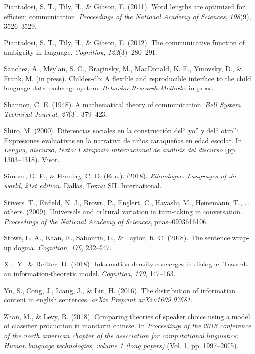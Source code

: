 \documentclass[10pt, letterpaper]{article}
\begin{document}
\hypertarget{ref-piantadosi2011}{}
Piantadosi, S. T., Tily, H., \& Gibson, E. (2011). Word lengths are
optimized for efficient communication. \emph{Proceedings of the National
Academy of Sciences}, \emph{108}(9), 3526--3529.

\hypertarget{ref-piantadosi2012}{}
Piantadosi, S. T., Tily, H., \& Gibson, E. (2012). The communicative
function of ambiguity in language. \emph{Cognition}, \emph{122}(3),
280--291.

\hypertarget{ref-sanchez2019}{}
Sanchez, A., Meylan, S. C., Braginsky, M., MacDonald, K. E., Yurovsky,
D., \& Frank, M. (in press). Childes-db: A flexible and reproducible
interface to the child language data exchange system. \emph{Behavior
Research Methods}. in press.

\hypertarget{ref-shannon1948}{}
Shannon, C. E. (1948). A mathematical theory of communication.
\emph{Bell System Technical Journal}, \emph{27}(3), 379--423.

\hypertarget{ref-shiro2000}{}
Shiro, M. (2000). Diferencias sociales en la construcción del`` yo'' y
del`` otro'': Expresiones evaluativas en la narrativa de niños
caraqueños en edad escolar. In \emph{Lengua, discurso, texto: I simposio
internacional de análisis del discurso} (pp. 1303--1318). Visor.

\hypertarget{ref-simons2018}{}
Simons, G. F., \& Fenning, C. D. (Eds.). (2018). \emph{Ethnologue:
Languages of the world, 21st edition}. Dallas, Texas: SIL International.

\hypertarget{ref-stivers2009universals}{}
Stivers, T., Enfield, N. J., Brown, P., Englert, C., Hayashi, M.,
Heinemann, T., \ldots{} others. (2009). Universals and cultural
variation in turn-taking in conversation. \emph{Proceedings of the
National Academy of Sciences}, pnas--0903616106.

\hypertarget{ref-stowe2018}{}
Stowe, L. A., Kaan, E., Sabourin, L., \& Taylor, R. C. (2018). The
sentence wrap-up dogma. \emph{Cognition}, \emph{176}, 232--247.

\hypertarget{ref-xu2018}{}
Xu, Y., \& Reitter, D. (2018). Information density converges in
dialogue: Towards an information-theoretic model. \emph{Cognition},
\emph{170}, 147--163.

\hypertarget{ref-yu2016}{}
Yu, S., Cong, J., Liang, J., \& Liu, H. (2016). The distribution of
information content in english sentences. \emph{arXiv Preprint
arXiv:1609.07681}.

\hypertarget{ref-zhan2018}{}
Zhan, M., \& Levy, R. (2018). Comparing theories of speaker choice using
a model of classifier production in mandarin chinese. In
\emph{Proceedings of the 2018 conference of the north american chapter
of the association for computational linguistics: Human language
technologies, volume 1 (long papers)} (Vol. 1, pp. 1997--2005).


\end{document}
